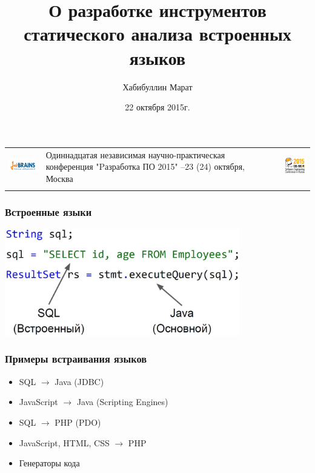 \documentclass{beamer}
\title[]{О разработке инструментов статического анализа встроенных языков}
\institute[СПб АУ РАН]{
Санкт-Петербургский Академический Университет\\
НОЦНТ РАН}
\author[Хабибуллин Марат]{Хабибуллин Марат}
\date{22 октября 2015г.}
\begin{document}
\begin{frame}
    \begin{tabular}[c c c]{m{3cm} m{6cm} m{}}
        \begin{center}
        \includegraphics[width=2.5cm]{JBLogoWhite.png}
    \end{center}
    &
    Одиннадцатая независимая 
    \newline 
    научно-практическая конференция 
    \newline "Pазработка ПО 2015" 
    \newline
    22–23 (24) октября, Москва
    &
    \begin{center}
        \includegraphics[width=2cm]{SecrLogo.png}
    \end{center}
    \\
    &&
    \end{tabular}
    \titlepage
\end{frame}

\begin{frame}[fragile]
	\transwipe[direction=90]
	\frametitle{Встроенные языки}
	\begin{center}
            \includegraphics[width=290pt]{pictures/string_embedded_language.jpg}
        \end{center}
\end{frame}

\begin{frame}[fragile]
	\transwipe[direction=90]
	\frametitle{Примеры встраивания языков}
	\begin{itemize}
		\item SQL $\rightarrow$ Java (JDBC)
		\item JavaScript $\rightarrow$ Java (Scripting Engines)
		\item SQL $\rightarrow$ PHP (PDO)
		\item JavaScript, HTML, CSS $\rightarrow$ PHP
		\item Генераторы кода
    \end{itemize}
\end{frame}
\end{document}
